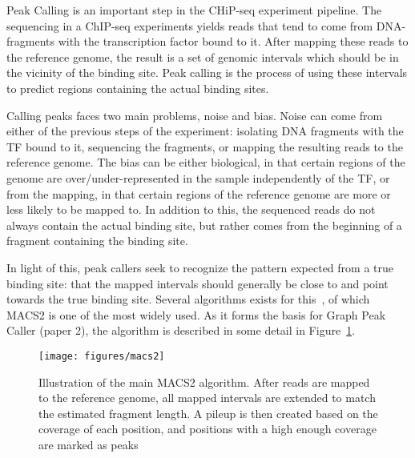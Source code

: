 Peak Calling is an important step in the CHiP-seq experiment pipeline.
The sequencing in a ChIP-seq experiments yields reads that tend to come from DNA-fragments with the transcription factor bound to it. After mapping these reads to the reference genome, the result is a set of genomic intervals which should be in the vicinity of the binding site. Peak calling is the process of using these intervals to predict regions containing the actual binding sites. 

Calling peaks faces two main problems, noise and bias. Noise can come from either of the previous steps of the experiment: isolating DNA fragments with the TF bound to it, sequencing the fragments, or mapping the resulting reads to the reference genome. The bias can be either biological, in that certain regions of the genome are over/under-represented in the sample independently of the TF, or from the mapping, in that certain regions of the reference genome are more or less likely to be mapped to. In addition to this, the sequenced reads do not always contain the actual binding site, but rather comes from the beginning of a fragment containing the binding site. 

In light of this, peak callers seek to recognize the pattern expected from a true binding site: that the mapped intervals should generally be close to and point towards the true binding site.
Several algorithms exists for this~\cite{SPP, MACS2, MACS}, of which MACS2 is one of the most widely used. As it forms the basis for Graph Peak Caller (paper 2), the algorithm is described in some detail in Figure~\ref{fig:macs}.

\begin{figure}
  \texttt{[image: figures/macs2]}
  \caption{Illustration of the main MACS2 algorithm. After reads are mapped to the reference genome, all mapped intervals are extended to match the estimated fragment length. A pileup is then created based on the coverage of each position, and positions with a high enough coverage are marked as peaks}
  \label{fig:macs}
\end{figure}

% 
% 
% 
% 
% 
% 
% 
% 
% 
% 
% 
% 
% 
% 
% 
% 
% 
% 
% 
% 
% 
% 
% 
% 
% 
% 
% 
% 
% 
% 
% 
% 
% 
% 
% 
% 
% 
% 
% 
% 
% 
% 
% 
% 
% 
% 
% 
% 
% 
% 
% 
% 
% 
% 
% 
% 
% 
% 
% 
% 
% 
% 
% 
% 
% 
% 
% 
% 
% 
% 
% 
% 
% 
% 
% 
% 
% 
% 
% 
% 
% 
% 
% 
% 
% 
% 
% 
% 
% 
% 
% 
% 
% 
% 
% 
% 
% 
% 
% 
% 
% 
% 
% 
% 
% 
% 
% 
% 
% 
% 
